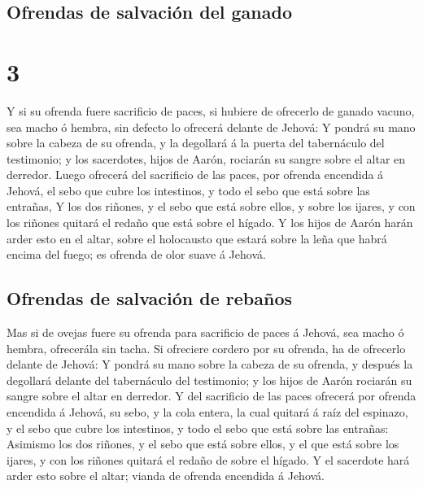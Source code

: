 \hypertarget{ofrendas-de-salvaciuxf3n-del-ganado}{%
\subsection{Ofrendas de salvación del
ganado}\label{ofrendas-de-salvaciuxf3n-del-ganado}}

\hypertarget{section-2}{%
\section{3}\label{section-2}}

 Y si su ofrenda fuere sacrificio de paces, si hubiere de
ofrecerlo de ganado vacuno, sea macho ó hembra, sin defecto lo ofrecerá
delante de Jehová:  Y pondrá su mano sobre la cabeza de su
ofrenda, y la degollará á la puerta del tabernáculo del testimonio; y
los sacerdotes, hijos de Aarón, rociarán su sangre sobre el altar en
derredor.  Luego ofrecerá del sacrificio de las paces, por
ofrenda encendida á Jehová, el sebo que cubre los intestinos, y todo el
sebo que está sobre las entrañas,  Y los dos riñones, y el
sebo que está sobre ellos, y sobre los ijares, y con los riñones quitará
el redaño que está sobre el hígado.  Y los hijos de Aarón
harán arder esto en el altar, sobre el holocausto que estará sobre la
leña que habrá encima del fuego; es ofrenda de olor suave á Jehová.

\hypertarget{ofrendas-de-salvaciuxf3n-de-rebauxf1os}{%
\subsection{Ofrendas de salvación de
rebaños}\label{ofrendas-de-salvaciuxf3n-de-rebauxf1os}}

 Mas si de ovejas fuere su ofrenda para sacrificio de
paces á Jehová, sea macho ó hembra, ofrecerála sin tacha. 
Si ofreciere cordero por su ofrenda, ha de ofrecerlo delante de Jehová:
 Y pondrá su mano sobre la cabeza de su ofrenda, y después
la degollará delante del tabernáculo del testimonio; y los hijos de
Aarón rociarán su sangre sobre el altar en derredor.  Y
del sacrificio de las paces ofrecerá por ofrenda encendida á Jehová, su
sebo, y la cola entera, la cual quitará á raíz del espinazo, y el sebo
que cubre los intestinos, y todo el sebo que está sobre las entrañas:
 Asimismo los dos riñones, y el sebo que está sobre
ellos, y el que está sobre los ijares, y con los riñones quitará el
redaño de sobre el hígado.  Y el sacerdote hará arder
esto sobre el altar; vianda de ofrenda encendida á Jehová.


